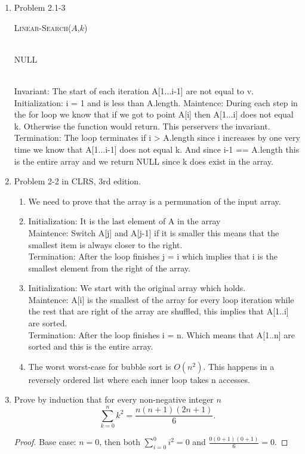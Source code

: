 \documentclass[letterpaper,11pt]{article}
\begin{document}




\begin{enumerate}
\item Problem 2.1-3 \\
\begin{algorithm}[!h]
\textsc{Linear-Search}($A$,$k$)
\begin{algorithmic}
\EndIf 
\Return \\
\EndFor
\Return NULL
\end{algorithmic}
\end{algorithm}\\
Invariant: The start of each iteration A[1...i-1] are not equal to v.\\
Initialization: i = 1 and is less than A.length.
Maintence: During each step in the for loop we know that if we got to point A[i] then A[1...i] does not equal k. Otherwise the function would return. This perservers the invariant.\\
Termination: The loop terminates if i > A.length since i increases by one very time we know that A[1...i-1] does not equal k. And since i-1 == A.length this is the entire array and we return NULL since k does exist in the array.
\item Problem 2-2 in CLRS, 3rd edition. 
\begin{enumerate}
\item We need to prove that the array is a permunation of the input array.

\item 
Initialization: It is the last element of A in the array \\
Maintence: Switch A[j] and A[j-1] if it is smaller this means that the smallest item is always closer to the right.\\
Termination: After the loop finishes j = i which implies that i is the smallest element from the right of the array.
\item
Initialization: We start with the original array which holds.\\
Maintence: A[i] is the smallest of the array for every loop iteration while the rest that are right of the array are shuffled, this implies that A[1..i] are sorted.\\
Termination: After the loop finishes i = n. Which means that A[1..n] are sorted and this is the entire array.
\item
The worst worst-case for bubble sort is $O(n^2)$. This happens in a reversely ordered list where each inner loop takes n accesses.
\end{enumerate}
\item Prove by induction that for every non-negative integer $n$
\[\sum_{k=0}^{n} k^2 = \frac{n(n+1)(2n+1)}{6}.\] 
\begin{proof}
Base case: $n=0$, then both $\sum_{i=0}^{0}i^2 = 0$ and $\frac{0(0+1)(0+1)}{6}= 0$.


\end{proof}
\end{enumerate}
\end{document}
